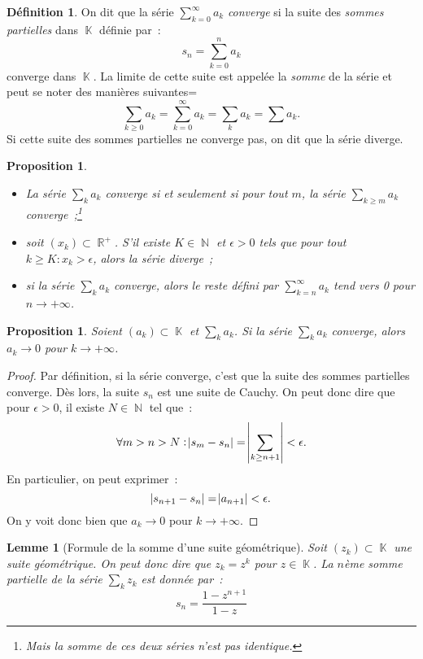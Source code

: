 \documentclass{article}
\DeclareMathOperator{\K}{\mathbb K}
\DeclareMathOperator{\R}{\mathbb R}
\DeclareMathOperator{\N}{\mathbb N}
\newcommand{\geomsum}[2]{\frac {1 - #1^{#2+1}}{1 - #1}}
\newtheorem{prp}[thm]{Proposition}
\newtheorem{lem}[thm]{Lemme}
\theoremstyle{definition}
\newtheorem{déf}[thm]{Définition}
\theoremstyle{remark}
\begin{document}
		\begin{déf} On dit que la série $\sum_{k=0}^\infty a_k$ \emph{converge} si la suite des \emph{sommes partielles} dans $\K$ définie par~:
		\[s_n = \sum_{k=0}^n a_k\]
		converge dans $\K$. La limite de cette suite est appelée la \emph{somme} de la série et peut se noter des manières suivantes=
		\[\sum_{k \geq 0} a_k = \sum_{k=0}^\infty a_k = \sum_k a_k = \sum a_k.\]
		Si cette suite des sommes partielles ne converge pas, on dit que la série diverge.
		\end{déf}

		\begin{prp}
		\begin{itemize}
			\item La série $\sum_k a_k$ converge si et seulement si pour tout $m$, la série $\sum_{k \geq m}a_k$ converge~;\footnote{Mais la somme de ces deux
			séries n'est pas identique.}
			\item soit $(x_k) \subset \R^+$. S'il existe $K \in \N$ et $\epsilon > 0$ tels que pour tout $k \geq K : x_k > \epsilon$, alors la série diverge~;
			\item si la série $\sum_k a_k$ converge, alors le \emph{reste} défini par $\sum_{k=n}^\infty a_k$ tend vers 0 pour $n \to +\infty$.
		\end{itemize}
		\end{prp}

		\begin{prp}\label{prp:siserieconvalorstermevers0} Soient $(a_k) \subset \K$ et $\sum_k a_k$. Si la série $\sum_k a_k$ converge, alors $a_k \to 0$ pour
		$k \to +\infty$.
		\end{prp}

		\begin{proof} Par définition, si la série converge, c'est que la suite des sommes partielles converge. Dès lors, la suite $s_n$ est une suite de Cauchy.
		On peut donc dire que pour $\epsilon > 0$, il existe $N \in \N$ tel que~:
		\[\forall m > n > N : \abs {s_m - s_n} = \abs {\sum_{k \geq n+1}} < \epsilon.\]
		En particulier, on peut exprimer~:
		\[\abs {s_{n+1} - s_n} = \abs {a_{n+1}} < \epsilon.\]
		On y voit donc bien que $a_k \to 0$ pour $k \to +\infty$.
		\end{proof}

		\begin{lem}[Formule de la somme d'une suite géométrique] Soit $(z_k) \subset \K$ une suite géométrique. On peut donc dire que $z_k = z^k$ pour
		$z \in \K$. La $n$ème somme partielle de la série $\sum_k z_k$ est donnée par~:
		\[s_n = \geomsum zn\]
		\end{lem}
\end{document}
